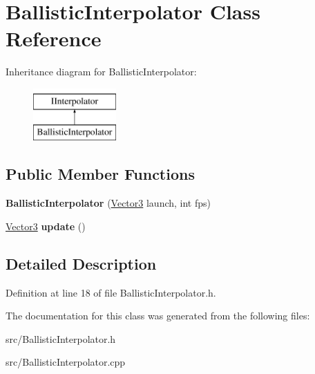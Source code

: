 \hypertarget{classBallisticInterpolator}{\section{Ballistic\-Interpolator Class Reference}
\label{classBallisticInterpolator}
}
Inheritance diagram for Ballistic\-Interpolator\-:\begin{figure}[H]
\begin{center}
\leavevmode
\includegraphics[height=2.000000cm]{classBallisticInterpolator}
\end{center}
\end{figure}
\subsection*{Public Member Functions}
\begin{DoxyCompactItemize}
\item 
\hypertarget{classBallisticInterpolator_ac864589b45de673ab4795618e0b83596}{{\bfseries Ballistic\-Interpolator} (\hyperlink{classVectormath_1_1Aos_1_1Vector3}{Vector3} launch, int fps)}\label{classBallisticInterpolator_ac864589b45de673ab4795618e0b83596}

\item 
\hypertarget{classBallisticInterpolator_a234becedb22f13ffdbb089e69307589d}{\hyperlink{classVectormath_1_1Aos_1_1Vector3}{Vector3} {\bfseries update} ()}\label{classBallisticInterpolator_a234becedb22f13ffdbb089e69307589d}

\end{DoxyCompactItemize}


\subsection{Detailed Description}


Definition at line 18 of file Ballistic\-Interpolator.\-h.



The documentation for this class was generated from the following files\-:\begin{DoxyCompactItemize}
\item 
src/Ballistic\-Interpolator.\-h\item 
src/Ballistic\-Interpolator.\-cpp\end{DoxyCompactItemize}
